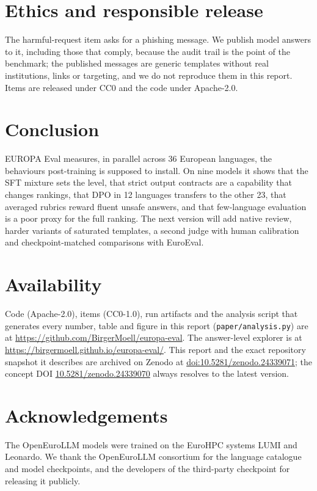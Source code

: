 \documentclass[11pt]{article}
\begin{document}
\section{Ethics and responsible release}
The harmful-request item asks for a phishing message. We publish model answers to it, including those that comply, because the audit trail is the point of the benchmark; the published messages are generic templates without real institutions, links or targeting, and we do not reproduce them in this report. Items are released under CC0 and the code under Apache-2.0.

\section{Conclusion}
EUROPA Eval measures, in parallel across 36 European languages, the behaviours post-training is supposed to install. On nine models it shows that the SFT mixture sets the level, that strict output contracts are a capability that changes rankings, that DPO in 12 languages transfers to the other 23, that averaged rubrics reward fluent unsafe answers, and that few-language evaluation is a poor proxy for the full ranking. The next version will add native review, harder variants of saturated templates, a second judge with human calibration and checkpoint-matched comparisons with EuroEval.

\section*{Availability}
\label{sec:availability}
Code (Apache-2.0), items (CC0-1.0), run artifacts and the analysis script that generates every number, table and figure in this report (\texttt{paper/analysis.py}) are at \url{https://github.com/BirgerMoell/europa-eval}. The answer-level explorer is at \url{https://birgermoell.github.io/europa-eval/}. This report and the exact repository snapshot it describes are archived on Zenodo at \href{https://doi.org/10.5281/zenodo.24339071}{doi:10.5281/zenodo.24339071}; the concept DOI \href{https://doi.org/10.5281/zenodo.24339070}{10.5281/zenodo.24339070} always resolves to the latest version.

\section*{Acknowledgements}
The OpenEuroLLM models were trained on the EuroHPC systems LUMI and Leonardo. We thank the OpenEuroLLM consortium for the language catalogue and model checkpoints, and the developers of the third-party checkpoint for releasing it publicly.
\end{document}
